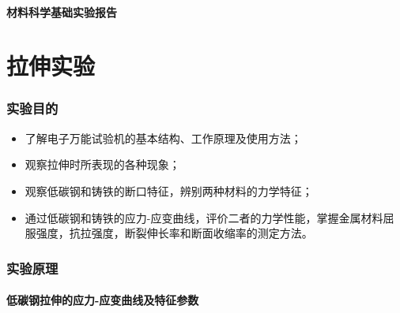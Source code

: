 \documentclass[a4paper,utf8]{article}
\begin{document}
\begin{center}
    {\mbox{}\\[7em]\bfseries\songti%
    材料科学基础实验报告}\\[34mm]
    \pointingbox
\end{center}
\newpage
\part{拉伸实验}
\section{实验目的}
\begin{itemize}
    \item 了解电子万能试验机的基本结构、工作原理及使用方法；
    \item 观察拉伸时所表现的各种现象；
    \item 观察低碳钢和铸铁的断口特征，辨别两种材料的力学特征；
    \item 通过低碳钢和铸铁的应力-应变曲线，评价二者的力学性能，掌握金属材料屈服强度，抗拉强度，断裂伸长率和断面收缩率的测定方法。
\end{itemize}
\section{实验原理}%
\subsection{低碳钢拉伸的应力-应变曲线及特征参数}
\end{document}
